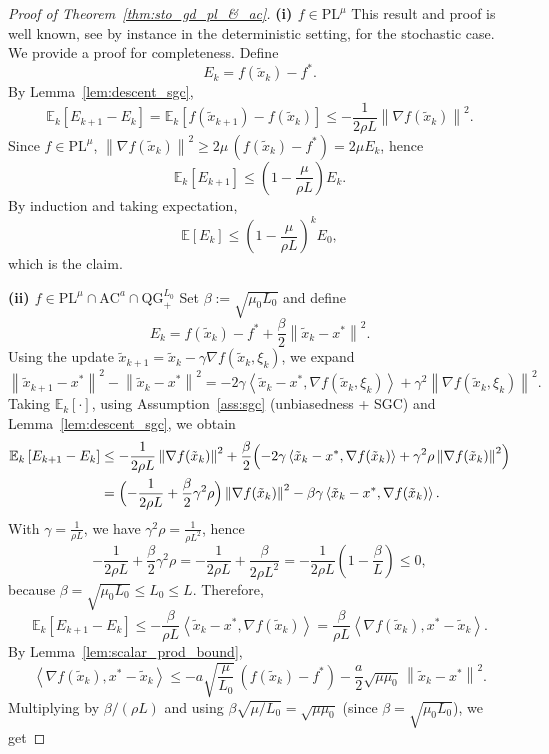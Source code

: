 \documentclass{article}
\def\pl{{\text{PL}^\mu}}
\newcommand{\bpar}[1]{\left(#1\right)}
\newcommand{\E}[1]{\mathbb{E}\left[#1 \right]}
\newcommand{\condE}[1]{\mathbb{E}_{k}\left[#1 \right]}
\newcommand{\norm}[1]{\left\lVert#1\right\rVert}
\newcommand{\dotprod}[1]{\left< #1\right>}
\newcommand{\ac}{\text{AC}^{a}}
\newcommand{\qg}{\text{QG}_{+}^{L_0}}
\theoremstyle{plain}
\theoremstyle{definition}
\theoremstyle{remark}
\begin{document}
\begin{proof}[Proof of Theorem~\ref{thm:sto_gd_pl_&_ac}]
\textbf{(i) $f \in \pl$ \:} This result and proof is well known, see by instance \cite{karimi2016linear} in the deterministic setting, \cite{vaswani2019fast} for the stochastic case. We provide a proof for completeness.
Define \[E_k = f(\tilde x_k)-f^\ast.\] By Lemma~\ref{lem:descent_sgc},
\[
\condE{E_{k+1}-E_k}
=\condE{f(\tilde x_{k+1})-f(\tilde x_k)}
\le -\frac{1}{2\rho L}\norm{\nabla f(\tilde x_k)}^2.
\]
Since $f\in\pl$, $\norm{\nabla f(\tilde x_k)}^2 \ge 2\mu\,(f(\tilde x_k)-f^\ast)=2\mu E_k$, hence
\[
\condE{E_{k+1}} \le \bpar{1-\frac{\mu}{\rho L}}E_k.
\]
By induction and taking expectation,
\[
\E{E_k}\le \bpar{1-\frac{\mu}{\rho L}}^k E_0,
\]
which is the claim.

\medskip
\textbf{(ii) $f \in \pl \cap \ac \cap \qg$ \:}
Set $\beta := \sqrt{\mu_0 L_0}$ and define
\[
E_k =f(\tilde x_k)-f^\ast + \frac{\beta}{2}\norm{\tilde x_k-x^\ast}^2.
\]
Using the update
$\tilde x_{k+1}=\tilde x_k-\gamma\nabla f(\tilde x_k,\xi_k)$, we expand
\[
\norm{\tilde x_{k+1}-x^\ast}^2-\norm{\tilde x_k-x^\ast}^2
= -2\gamma \dotprod{\tilde x_k-x^\ast,\nabla f(\tilde x_k,\xi_k)}
+ \gamma^2\norm{\nabla f(\tilde x_k,\xi_k)}^2.
\]
Taking $\condE{\cdot}$, using Assumption~\ref{ass:sgc} (unbiasedness + SGC) and Lemma~\ref{lem:descent_sgc}, we obtain
\begin{align*}
\condE{E_{k+1}-E_k}
&\le -\frac{1}{2\rho L}\norm{\nabla f(\tilde x_k)}^2
+ \frac{\beta}{2}\Bigl(
-2\gamma \dotprod{\tilde x_k-x^\ast,\nabla f(\tilde x_k)}
+ \gamma^2\rho \norm{\nabla f(\tilde x_k)}^2
\Bigr)\\
&= \Bigl(-\frac{1}{2\rho L}+\frac{\beta}{2}\gamma^2\rho\Bigr)\norm{\nabla f(\tilde x_k)}^2
-\beta\gamma \dotprod{\tilde x_k-x^\ast,\nabla f(\tilde x_k)}.
\end{align*}
With $\gamma=\frac{1}{\rho L}$, we have $\gamma^2\rho=\frac{1}{\rho L^2}$, hence
\[
-\frac{1}{2\rho L}+\frac{\beta}{2}\gamma^2\rho
= -\frac{1}{2\rho L}+\frac{\beta}{2\rho L^2}
= -\frac{1}{2\rho L}\bpar{1-\frac{\beta}{L}} \le 0,
\]
because $\beta=\sqrt{\mu_0L_0}\le L_0\le L$. Therefore,
\[
\condE{E_{k+1}-E_k}
\le -\frac{\beta}{\rho L}\dotprod{\tilde x_k-x^\ast,\nabla f(\tilde x_k)}
= \frac{\beta}{\rho L}\dotprod{\nabla f(\tilde x_k),x^\ast-\tilde x_k}.
\]
By Lemma~\ref{lem:scalar_prod_bound},
\[
\dotprod{\nabla f(\tilde x_k),x^\ast-\tilde x_k}
\le -a\sqrt{\frac{\mu}{L_0}}\,(f(\tilde x_k)-f^\ast)
-\frac{a}{2}\sqrt{\mu\mu_0}\,\norm{\tilde x_k-x^\ast}^2.
\]
Multiplying by $\beta/(\rho L)$ and using $\beta\sqrt{\mu/L_0}=\sqrt{\mu\mu_0}$ (since $\beta=\sqrt{\mu_0L_0}$), we get

\end{proof}
\end{document}
